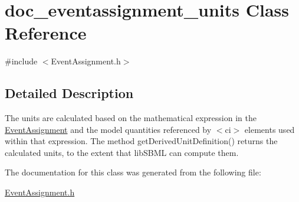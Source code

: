 \hypertarget{classdoc__eventassignment__units}{}\section{doc\+\_\+eventassignment\+\_\+units Class Reference}
\label{classdoc__eventassignment__units}


{\ttfamily \#include $<$Event\+Assignment.\+h$>$}



\subsection{Detailed Description}
\begin{DoxyParagraph}{}
The units are calculated based on the mathematical expression in the \hyperlink{class_event_assignment}{Event\+Assignment} and the model quantities referenced by {\ttfamily $<$ci$>$} elements used within that expression. The method get\+Derived\+Unit\+Definition() returns the calculated units, to the extent that lib\+S\+B\+ML can compute them. 
\end{DoxyParagraph}


The documentation for this class was generated from the following file\+:\begin{DoxyCompactItemize}
\item 
\hyperlink{_event_assignment_8h}{Event\+Assignment.\+h}\end{DoxyCompactItemize}
